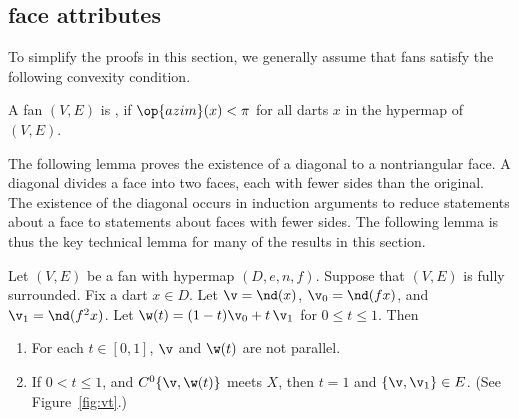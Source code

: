 \subsection{face attributes}

To simplify the proofs in this section,  we generally assume that fans 
satisfy the following  convexity condition.

\begin{definition}
A fan $(V,E)$ is , if $\op{azim}(x)<\pi$
for all darts $x$ in the hypermap of $(V,E)$.
\end{definition}
%

The following lemma proves the existence of a diagonal to a nontriangular
face.  A diagonal  divides a face into two faces, each with fewer sides
than the original.  The existence of the diagonal occurs in induction arguments
to reduce statements about a face to statements about faces with fewer sides.
The following lemma is thus the key technical lemma for many of the results
in this section.

\begin{lemma}[sweep]\label{lemma:sweep}  
Let $(V,E)$ be a fan with hypermap $(D,e,n,f)$.  
Suppose that $(V,E)$ is fully surrounded. Fix a dart $x\in D$.
Let $\v = \nd(x)$, $\v_0 = \nd(f x)$,
and $\v_1 = \nd(f^2 x)$.  Let $\w(t) = (1-t) \v_0 + t\, \v_1$ for
$0\le t\le 1$.  Then
\begin{enumerate}\wasitemize 
\item  For each $t\in[0,1]$, $\v$ and $\w(t)$ are not parallel.
\item If $0 < t \le 1$, and $C^0\{\v,\w(t)\}$ meets $X$, then $t=1$ and
$\{\v,\v_1\}\in E$.  (See Figure~\ref{fig:vt}.)
\end{enumerate}\wasitemize 
\end{lemma}

\figJCAEBKL %



